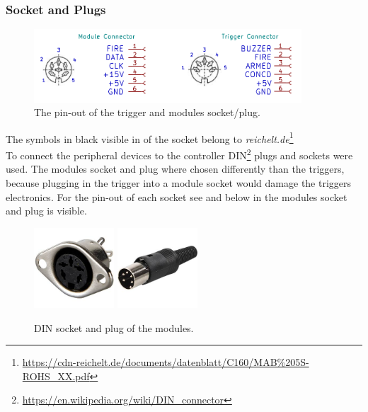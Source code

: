 \subsubsection{Socket and Plugs}
\label{Socket and Plugs}

\begin{figure}[!ht]
    \centering
    \includegraphics[width=10cm]{./Figures/mod_trig_connector.png}
    \caption{The pin-out of the trigger and modules socket/plug.   }
    \label{fig:mod_trig_connector}     
\end{figure}

\noindent The symbols in black visible in  of the socket belong to \textit{reichelt.de}\footnote{\url{https://cdn-reichelt.de/documents/datenblatt/C160/MAB\%205S-ROHS_XX.pdf}}\\

\noindent To connect the peripheral devices to the controller DIN\footnote{\url{https://en.wikipedia.org/wiki/DIN_connector}} plugs and sockets were used. The modules socket and plug where chosen differently than the triggers, because plugging in the trigger into a module socket would damage the triggers electronics. For the pin-out of each socket see  and below in  the modules socket and plug is visible.

\begin{figure}[!ht]
    \centering
    \includegraphics[width=3cm]{./Figures/MAB_5.jpg}
    \hspace{2cm}
    \includegraphics[width=3cm]{./Figures/MAS_50.jpg}
    \caption{DIN socket and plug of the modules.}
    \label{fig:din_plug_socket}     
\end{figure}


